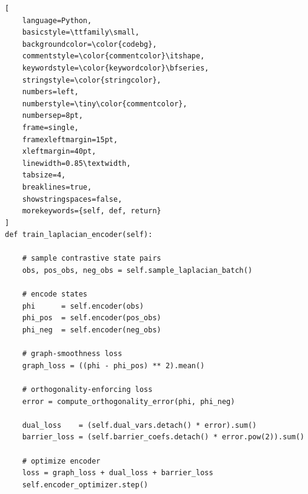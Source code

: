 \documentclass{article}
\theoremstyle{plain}
\theoremstyle{definition}
\theoremstyle{remark}
\begin{document}
\begin{lstlisting}[
    language=Python,
    basicstyle=\ttfamily\small,
    backgroundcolor=\color{codebg},
    commentstyle=\color{commentcolor}\itshape,
    keywordstyle=\color{keywordcolor}\bfseries,
    stringstyle=\color{stringcolor},
    numbers=left,
    numberstyle=\tiny\color{commentcolor},
    numbersep=8pt,
    frame=single,
    framexleftmargin=15pt,
    xleftmargin=40pt,
    linewidth=0.85\textwidth,
    tabsize=4,
    breaklines=true,
    showstringspaces=false,
    morekeywords={self, def, return}
]
def train_laplacian_encoder(self):

    # sample contrastive state pairs
    obs, pos_obs, neg_obs = self.sample_laplacian_batch()

    # encode states
    phi      = self.encoder(obs)
    phi_pos  = self.encoder(pos_obs)
    phi_neg  = self.encoder(neg_obs)

    # graph-smoothness loss
    graph_loss = ((phi - phi_pos) ** 2).mean()

    # orthogonality-enforcing loss
    error = compute_orthogonality_error(phi, phi_neg)

    dual_loss    = (self.dual_vars.detach() * error).sum()
    barrier_loss = (self.barrier_coefs.detach() * error.pow(2)).sum()

    # optimize encoder
    loss = graph_loss + dual_loss + barrier_loss
    self.encoder_optimizer.step()
\end{lstlisting}

\vspace{10pt}
\end{document}
